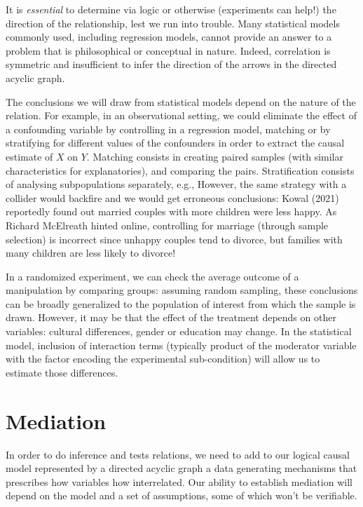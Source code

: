 \documentclass[
  11pt,
  letterpaper,
]{scrbook}
\theoremstyle{definition}
\theoremstyle{remark}
\begin{document}
It is \emph{essential} to determine via logic or otherwise (experiments
can help!) the direction of the relationship, lest we run into trouble.
Many statistical models commonly used, including regression models,
cannot provide an answer to a problem that is philosophical or
conceptual in nature. Indeed, correlation is symmetric and insufficient
to infer the direction of the arrows in the directed acyclic graph.

The conclusions we will draw from statistical models depend on the
nature of the relation. For example, in an observational setting, we
could eliminate the effect of a confounding variable by controlling in a
regression model, matching or by stratifying for different values of the
confounders in order to extract the causal estimate of \(X\) on \(Y\).
Matching consists in creating paired samples (with similar
characteristics for explanatories), and comparing the pairs.
Stratification consists of analysing subpopulations separately, e.g.,
However, the same strategy with a collider would backfire and we would
get erroneous conclusions: Kowal (2021) reportedly found out married
couples with more children were less happy. As Richard McElreath hinted
online, controlling for marriage (through sample selection) is incorrect
since unhappy couples tend to divorce, but families with many children
are less likely to divorce!

In a randomized experiment, we can check the average outcome of a
manipulation by comparing groups: assuming random sampling, these
conclusions can be broadly generalized to the population of interest
from which the sample is drawn. However, it may be that the effect of
the treatment depends on other variables: cultural differences, gender
or education may change. In the statistical model, inclusion of
interaction terms (typically product of the moderator variable with the
factor encoding the experimental sub-condition) will allow us to
estimate those differences.

\hypertarget{mediation}{%
\section{Mediation}\label{mediation}}

In order to do inference and tests relations, we need to add to our
logical causal model represented by a directed acyclic graph a data
generating mechanisms that prescribes how variables how interrelated.
Our ability to establish mediation will depend on the model and a set of
assumptions, some of which won't be verifiable.
\end{document}

